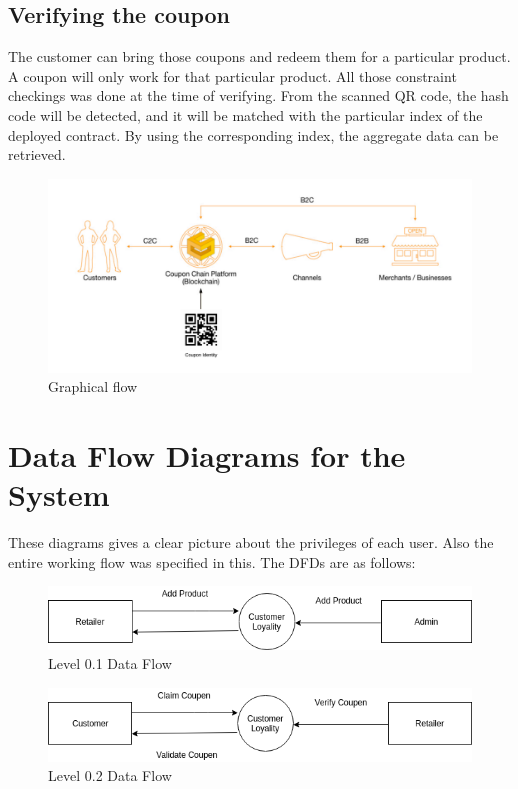 \subsection{Verifying the coupon}
The customer can bring those coupons and redeem them for a particular product. A coupon will only work for that particular product. All those constraint checkings was done at the time of verifying. From the scanned QR code, the hash code will be detected, and it will be matched with the particular index of the deployed contract. By using the corresponding index, the aggregate data can be retrieved.
\begin{figure}[H]
\includegraphics[scale=0.6]{flow}
\caption{Graphical flow}
\end{figure}

\section{Data Flow Diagrams for the System}
\par
These diagrams gives a clear picture about the privileges of each user. Also the entire working flow was specified in this. The DFDs are as follows:
\begin{figure}[H]
\includegraphics[scale=0.7]{level0_1}
\caption{Level 0.1 Data Flow}
\end{figure}

\begin{figure}[H]
\includegraphics[scale=0.7]{level0_2}
\caption{Level 0.2 Data Flow}
\end{figure}


